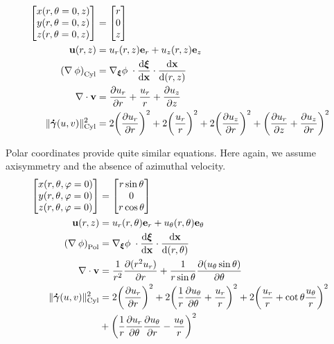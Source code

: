 \documentclass[11 pt]{report}
\begin{document}
\begin{align}
    \begin{bmatrix}
        x(r, \theta=0, z) \\
        y(r, \theta=0, z) \\
        z(r, \theta=0, z) \\
    \end{bmatrix} &=
    \begin{bmatrix}
        r \\
        0 \\
        z
    \end{bmatrix}\\
    \mathbf{u}(r, z) &= u_r(r, z) \mathbf{e}_r + u_z(r, z) \mathbf{e}_z\\
    \left(\nabla \: \phi\right)_{\text{Cyl}} &= \nabla_{\boldsymbol\xi} \phi \; \cdot \dv{\boldsymbol \xi}{\mathbf{x}} \cdot \dv{\mathbf{x}}{(r, z)}\\
    \nabla \cdot \mathbf{v} &= \pdv{u_r}{r} + \frac{u_r}{r} + \pdv{u_z}{z}\\
    \|\boldsymbol{\dot \gamma}(u, v)\|_{\text{Cyl}}^2 &= 2 \bigg(\pdv{u_r}{r}\bigg)^2 + 2\bigg(\frac{u_r}{r}\bigg)^2 + 2\bigg(\pdv{u_z}{r}\bigg)^2 + \bigg(\pdv{u_r}{z} + \pdv{u_z}{r}\bigg)^2
\end{align}

Polar coordinates provide quite similar equations. Here again, we assume axisymmetry and the absence of azimuthal velocity.
\begin{align}
    \begin{bmatrix}
        x(r, \theta, \varphi=0) \\
        y(r, \theta, \varphi=0) \\
        z(r, \theta, \varphi=0)
    \end{bmatrix} &=
    \begin{bmatrix}
        r \sin{\theta} \\
        0\\
        r \cos{\theta} \\
    \end{bmatrix}\\
    \mathbf{u}(r, z) &= u_r(r, \theta) \mathbf{e}_r + u_\theta(r, \theta) \mathbf{e}_\theta\\
    \left(\nabla \: \phi\right)_{\text{Pol}} &= \nabla_{\boldsymbol\xi} \phi \; \cdot \dv{\boldsymbol \xi}{\mathbf{x}} \cdot \dv{\mathbf{x}}{(r, \theta)} \\
    \nabla \cdot \mathbf{v} &= \frac{1}{r^2}\pdv{(r^2 u_r)}{r} + \frac{1}{r\sin\theta} \pdv{(u_\theta \sin \theta)}{\theta}\\
    \|\boldsymbol{\dot \gamma}(u, v)\|_{\text{Cyl}}^2 &= 2 \bigg(\pdv{u_r}{r}\bigg)^2 + 2\bigg(\frac{1}{r}\pdv{u_\theta}{\theta} + \frac{u_r}{r}\bigg)^2 + 2\bigg(\frac{u_r}{r} + \cot \theta \frac{u_\theta}{r}\bigg)^2 \nonumber\\
    &+ \bigg(\frac{1}{r}\pdv{u_r}{\theta} \pdv{u_\theta}{r} - \frac{u_\theta}{r}\bigg)^2
\end{align}

%
\end{document}
